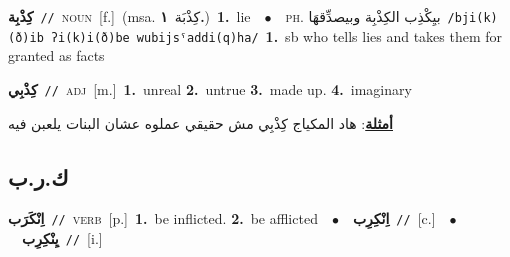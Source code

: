 \documentclass[10pt,a4paper,twoside]{article} %
\begin{document}
\begin{multicols}{2}
{\setlength\topsep{0pt}\textbf{\foreignlanguage{arabic}{كِذْبِة}}\ {\color{gray}\texttt{//}\color{black}}\ \textsc{noun}\ [f.]\ \color{gray}(msa. \foreignlanguage{arabic}{كِذْبَة}~\foreignlanguage{arabic}{\textbf{١.}})\color{black}\ \textbf{1.}~lie\ \ $\bullet$\ \ \textsc{ph.} \color{gray} \foreignlanguage{arabic}{بيِكْذِب الكِذْبِة وبيصدِّقهَا}\color{black}\ {\color{gray}\texttt{/{\sffamily bji(k)(ð)ib ʔi(k)i(ð)be wubijsˤaddi(q)ha}/}\color{black}}\ \textbf{1.}~sb who tells lies and takes them for granted as facts\ } \vspace{2mm}

{\setlength\topsep{0pt}\textbf{\foreignlanguage{arabic}{كِذْبِي}}\ {\color{gray}\texttt{//}\color{black}}\ \textsc{adj}\ [m.]\ \textbf{1.}~unreal  \textbf{2.}~untrue  \textbf{3.}~made up.  \textbf{4.}~imaginary\  \begin{flushright}\color{gray}\foreignlanguage{arabic}{\textbf{\underline{\foreignlanguage{arabic}{أمثلة}}}: هاد المكياج كِذْبِي مش حقيقي عملوه عشان البنات يلعبن فيه}\end{flushright}\color{black}} \vspace{2mm}

\vspace{-3mm}
\subsection*{\color{blue}\foreignlanguage{arabic}{ك.ر.ب}\color{blue}{}} 

{\setlength\topsep{0pt}\textbf{\foreignlanguage{arabic}{اِنْكَرَب}}\ {\color{gray}\texttt{//}\color{black}}\ \textsc{verb}\ [p.]\ \textbf{1.}~be inflicted.  \textbf{2.}~be afflicted\ \ $\bullet$\ \ \setlength\topsep{0pt}\textbf{\foreignlanguage{arabic}{اِنْكِرِب}}\ {\color{gray}\texttt{//}\color{black}}\ [c.]\ \ $\bullet$\ \ \setlength\topsep{0pt}\textbf{\foreignlanguage{arabic}{يِنْكِرِب}}\ {\color{gray}\texttt{//}\color{black}}\ [i.]\ } \vspace{2mm}


\end{multicols}
\end{document}
